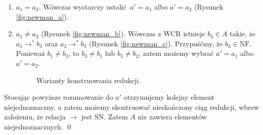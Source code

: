 \begin{dowod}
  \begin{enumerate}[label={\roman*)}, ref={\roman*)}]
    \setlength\itemsep{0em}
    \item \(a_1 = a_2\). Wówczas wystarczy ustalić \(a'=a_1\) albo \(a'=a_2\) (Rysunek \ref{fig:newman_a}).
    \item \(a_1\neq a_2\) (Rysunek \ref{fig:newman_b}). Wówczas z WCR istnieje \(b_3\in A\) takie, że \(a_1 \to^{*} b_3\) oraz \(a_2\to^{*} b_3\) (Rysunek \ref{fig:newman_c}). Przypuśćmy, że \(b_3\in\mathrm{NF}\). Ponieważ \(b_1\neq b_3\), to \(b_3\neq b_1\) lub \(b_3\neq b_2\), zatem możemy wybrać \(a'=a_1\) albo \(a'=a_2\).  
    \begin{center}
      \begin{minipage}{0.75\linewidth}
        \begin{figure}[H]
          \centering
          \hspace{4em}
          \hspace{4em}
          \hfill
          \caption{Warianty konstruowania redukcji.} 
        \end{figure}
      \end{minipage}
    \end{center}
  \end{enumerate}
  Stosując powyższe rozumowanie do \(a'\) otrzymujemy kolejny element niejednoznaczny. a zatem możemy skontruować nieskończony ciąg redukcji, wbrew zalożeniu, że relacja \(\to\) jest SN. Zatem \(A\) nie zawiera elementów niejednoznacznych. \qed
\end{dowod}
